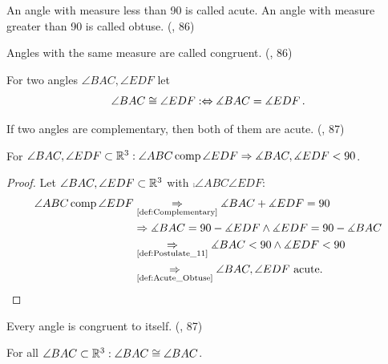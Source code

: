 \begin{definition}\label{def:Acute_Obtuse}
  An angle with measure less than 90 is called acute.
  An angle with measure greater than 90 is called obtuse.
  (\cite{SMSGGeometry}, 86)

\end{definition}

\begin{definition}\label{def:Congruent_Angles}
  Angles with the same measure are called congruent.
  (\cite{SMSGGeometry}, 86)

  For two angles $\angle BAC, \angle EDF$ let
  \[
  \angle BAC \cong \angle EDF :\Leftrightarrow \measuredangle BAC = \measuredangle EDF\, \text{.}
  \]

\end{definition}

\begin{theorem}[4-1.]\label{thm:4-1.}
  If two angles are complementary, then both of them are acute.
  (\cite{SMSGGeometry}, 87)

  For $\angle BAC, \angle EDF \subset \mathbb{R}^3: {\angle ABC}\operatorname{comp}{\angle EDF} \Rightarrow \measuredangle BAC, \measuredangle EDF <90$.
\end{theorem}

\begin{proof}
  Let $\angle BAC, \angle EDF \subset \mathbb{R}^3$ with $ \comp{\angle ABC}{\angle EDF}$:
  \begin{align*}
    {\angle ABC}\operatorname{comp}{\angle EDF}
        &\underset{\text{\ref{def:Complementary}}}{\Rightarrow} \measuredangle BAC+\measuredangle EDF = 90 \\
        &\Rightarrow \measuredangle BAC=90-\measuredangle EDF \land \measuredangle EDF=90-\measuredangle BAC \\
        &\underset{\text{\ref{def:Postulate_11}}}{\Rightarrow} \measuredangle BAC <90 \land \measuredangle EDF < 90 \\
        &\underset{\text{\ref{def:Acute_Obtuse}}}{\Rightarrow} \angle BAC, \angle EDF \text{ acute.}
  \end{align*}
\end{proof}

\begin{theorem}[4-2.]\label{thm:4-2.}
  Every angle is congruent to itself.
  (\cite{SMSGGeometry}, 87)

  For all $\angle BAC \subset \mathbb{R}^3: \angle BAC \cong \angle BAC$.
\end{theorem}


